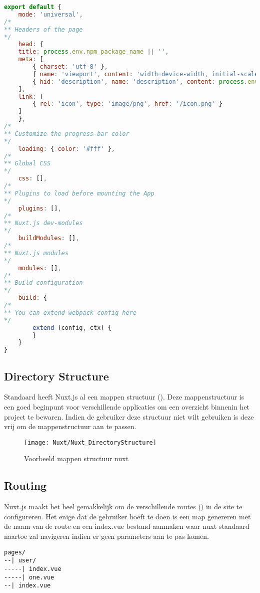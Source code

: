 \begin{lstlisting}[caption=Configuration, language=Javascript]
export default {
	mode: 'universal',
/*
** Headers of the page
*/
	head: {
	title: process.env.npm_package_name || '',
	meta: [
		{ charset: 'utf-8' },
		{ name: 'viewport', content: 'width=device-width, initial-scale=1' },
		{ hid: 'description', name: 'description', content: process.env.npm_package_description || '' }
	],
	link: [
		{ rel: 'icon', type: 'image/png', href: '/icon.png' }
	]
	},
/*
** Customize the progress-bar color
*/
	loading: { color: '#fff' },
/*
** Global CSS
*/
	css: [],
/*
** Plugins to load before mounting the App
*/
	plugins: [],
/*
** Nuxt.js dev-modules
*/
	buildModules: [],
/*
** Nuxt.js modules
*/
	modules: [],
/*
** Build configuration
*/
	build: {
/*
** You can extend webpack config here
*/
		extend (config, ctx) {
		}
	}
}
\end{lstlisting}


\subsection{Directory Structure}
Standaard heeft Nuxt.js al een mappen structuur (\cite{NUXT_DIRECTORYSTRUCTURE}). Deze mappenstructuur is een goed beginpunt voor verschillende applicaties om een overzicht binnenin het project te bewaren. Indien de gebruiker deze structuur niet wilt gebruiken is deze vrij om de mappenstructuur aan te passen.

\begin{figure}[!h]
	\texttt{[image: Nuxt/Nuxt\_DirectoryStructure]}\centering
	\caption{Voorbeeld mappen structuur nuxt}
\end{figure}


\subsection{Routing}
Nuxt.js maakt het heel gemakkelijk om de verschillende routes (\cite{NUXT_ROUTING}) in de site te configureren. Het enige dat de gebruiker hoeft te doen is een map genereren met de naam van de route en een index.vue bestand aanmaken waar nuxt standaard naartoe zal navigeren indien er geen parameters aan te pas komen.

\begin{lstlisting}[caption=Routering mappenstuctuur]
pages/
--| user/
-----| index.vue
-----| one.vue
--| index.vue
\end{lstlisting}

